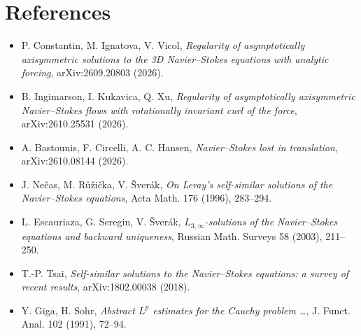 \documentclass[11pt,a4paper]{article}
\begin{document}
\section*{References}
\begin{itemize}[leftmargin=1.6em]
\item P. Constantin, M. Ignatova, V. Vicol, \emph{Regularity of asymptotically axisymmetric
solutions to the 3D Navier--Stokes equations with analytic forcing}, arXiv:2609.20803 (2026).
\item B. Ingimarson, I. Kukavica, Q. Xu, \emph{Regularity of asymptotically axisymmetric
Navier--Stokes flows with rotationally invariant curl of the force}, arXiv:2610.25531 (2026).
\item A. Bastounis, F. Circelli, A. C. Hansen, \emph{Navier--Stokes lost in translation},
arXiv:2610.08144 (2026).
\item J. Ne\v{c}as, M. R\r{u}\v{z}i\v{c}ka, V. \v{S}ver\'ak, \emph{On Leray's self-similar
solutions of the Navier--Stokes equations}, Acta Math. 176 (1996), 283--294.
\item L. Escauriaza, G. Seregin, V. \v{S}ver\'ak, \emph{$L_{3,\infty}$-solutions of the
Navier--Stokes equations and backward uniqueness}, Russian Math. Surveys 58 (2003), 211--250.
\item T.-P. Tsai, \emph{Self-similar solutions to the Navier--Stokes equations: a survey of
recent results}, arXiv:1802.00038 (2018).
\item Y. Giga, H. Sohr, \emph{Abstract $L^p$ estimates for the Cauchy problem \dots},
J. Funct. Anal. 102 (1991), 72--94.
\end{itemize}
\end{document}
